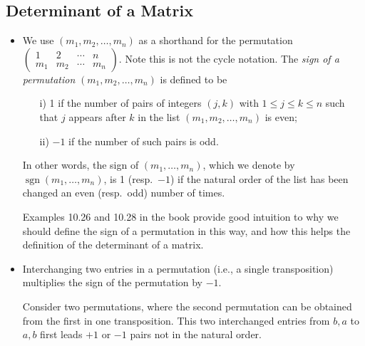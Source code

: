 \documentclass[11pt]{article}
\newcommand{\df}[1]{\textit{\textsf{#1}}}
\newcommand{\sgn}{\operatorname{sgn}}
\begin{document}
\subsection{Determinant of a Matrix}
\begin{itemize}
    \item We use $(m_1,m_2,\dots,m_n)$ as a shorthand for the permutation $\begin{pmatrix} 1 & 2 & \cdots & n \\ m_1 & m_2 & \cdots & m_n \end{pmatrix}$. Note this is not the cycle notation. The \df{sign of a permutation} $(m_1,m_2,\dots,m_n)$ is defined to be
    \begin{enumerate}
        \item [i)] 1 if the number of pairs of integers $(j,k)$ with $1 \leq j \leq k \leq n$ such that $j$ appears after $k$ in the list $(m_1,m_2,\dots,m_n)$ is even;
        \item [ii)] $-1$ if the number of such pairs is odd.
    \end{enumerate}
    In other words, the sign of $(m_1,\dots,m_n)$, which we denote by $\sgn(m_1,\dots,m_n)$, is 1 (resp.\ $-1$) if the natural order of the list has been changed an even (resp.\ odd) number of times.
    
    Examples 10.26 and 10.28 in the book provide good intuition to why we should define the sign of a permutation in this way, and how this helps the definition of the determinant of a matrix.
    
    \item Interchanging two entries in a permutation (i.e., a single transposition) multiplies the sign of the permutation by $-1$.
    
    Consider two permutations, where the second permutation can be obtained from the first in one transposition. This two interchanged entries from $b,a$ to $a,b$ first leads $+1$ or $-1$ pairs not in the natural order.


\end{itemize}
\end{document}
